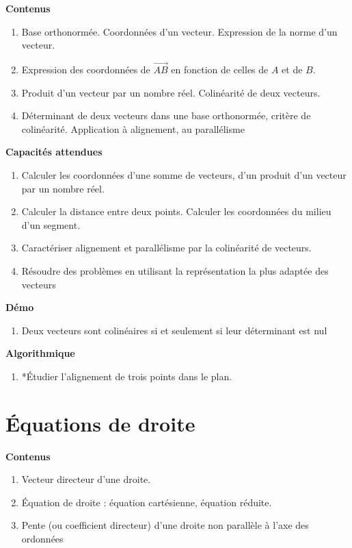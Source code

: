 \documentclass[10pt,a4paper]{article}
\begin{document}
\textbf{Contenus}

\begin{enumerate}
\item Base orthonormée. Coordonnées d’un vecteur. Expression de la norme d’un vecteur.
\item Expression des coordonnées de $\overrightarrow{AB}$ en fonction de celles de $A$ et de $B$.
\item Produit d’un vecteur par un nombre réel. Colinéarité de deux vecteurs.
\item Déterminant de deux vecteurs dans une base orthonormée, critère de colinéarité. 
Application à alignement, au parallélisme
\end{enumerate}

\textbf{Capacités attendues}
 
\begin{enumerate}
\item Calculer les coordonnées d'une somme de vecteurs, d'un produit d'un vecteur par un nombre réel.
\item Calculer la distance entre deux points. Calculer les coordonnées du milieu d'un segment.
\item Caractériser alignement et parallélisme par la colinéarité de vecteurs.
\item  Résoudre des problèmes en utilisant la représentation la plus adaptée des vecteurs
\end{enumerate}

\textbf{Démo}

\begin{enumerate}
\item Deux vecteurs sont colinéaires si et seulement si leur déterminant est nul
\end{enumerate}

 
\textbf{Algorithmique}

\begin{enumerate}
\item *Étudier l'alignement de trois points dans le plan.
\end{enumerate}

 

\section{Équations de droite}

\textbf{Contenus}

\begin{enumerate}
\item Vecteur directeur d'une droite.
\item Équation de droite : équation cartésienne, équation réduite.
\item Pente (ou coefficient directeur) d'une droite non parallèle à l'axe des ordonnées
\end{enumerate}
\end{document}
